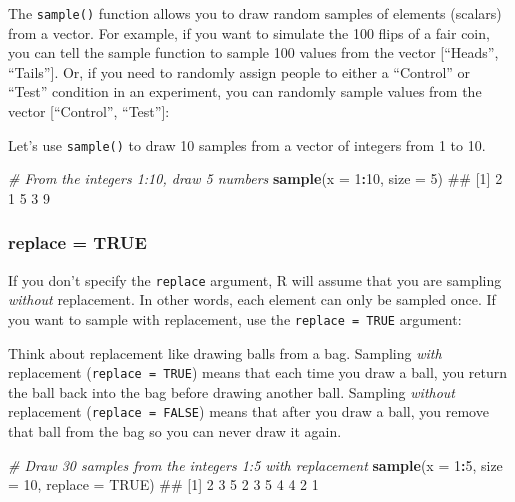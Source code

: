 \documentclass[]{book}
\newenvironment{Shaded}{\begin{snugshade}}{\end{snugshade}}
\newcommand{\KeywordTok}[1]{\textcolor[rgb]{0.13,0.29,0.53}{\textbf{#1}}}
\newcommand{\DataTypeTok}[1]{\textcolor[rgb]{0.13,0.29,0.53}{#1}}
\newcommand{\DecValTok}[1]{\textcolor[rgb]{0.00,0.00,0.81}{#1}}
\newcommand{\CommentTok}[1]{\textcolor[rgb]{0.56,0.35,0.01}{\textit{#1}}}
\newcommand{\OtherTok}[1]{\textcolor[rgb]{0.56,0.35,0.01}{#1}}
\newcommand{\OperatorTok}[1]{\textcolor[rgb]{0.81,0.36,0.00}{\textbf{#1}}}
\newcommand{\NormalTok}[1]{#1}
\theoremstyle{definition}
\theoremstyle{definition}
\theoremstyle{remark}
\begin{document}
The \texttt{sample()} function allows you to draw random samples of
elements (scalars) from a vector. For example, if you want to simulate
the 100 flips of a fair coin, you can tell the sample function to sample
100 values from the vector {[}``Heads'', ``Tails''{]}. Or, if you need
to randomly assign people to either a ``Control'' or ``Test'' condition
in an experiment, you can randomly sample values from the vector
{[}``Control'', ``Test''{]}:

Let's use \texttt{sample()} to draw 10 samples from a vector of integers
from 1 to 10.

\begin{Shaded}
\begin{Highlighting}[]
\CommentTok{# From the integers 1:10, draw 5 numbers}
\KeywordTok{sample}\NormalTok{(}\DataTypeTok{x =} \DecValTok{1}\OperatorTok{:}\DecValTok{10}\NormalTok{, }\DataTypeTok{size  =} \DecValTok{5}\NormalTok{)}
\NormalTok{## [1] 2 1 5 3 9}
\end{Highlighting}
\end{Shaded}

\subsubsection{replace = TRUE}\label{replace-true}

If you don't specify the \texttt{replace} argument, R will assume that
you are sampling \emph{without} replacement. In other words, each
element can only be sampled once. If you want to sample with
replacement, use the \texttt{replace\ =\ TRUE} argument:

Think about replacement like drawing balls from a bag. Sampling
\emph{with} replacement (\texttt{replace\ =\ TRUE}) means that each time
you draw a ball, you return the ball back into the bag before drawing
another ball. Sampling \emph{without} replacement
(\texttt{replace\ =\ FALSE}) means that after you draw a ball, you
remove that ball from the bag so you can never draw it again.

\begin{Shaded}
\begin{Highlighting}[]
\CommentTok{# Draw 30 samples from the integers 1:5 with replacement}
\KeywordTok{sample}\NormalTok{(}\DataTypeTok{x =} \DecValTok{1}\OperatorTok{:}\DecValTok{5}\NormalTok{, }\DataTypeTok{size =} \DecValTok{10}\NormalTok{, }\DataTypeTok{replace =} \OtherTok{TRUE}\NormalTok{)}
\NormalTok{##  [1] 2 3 5 2 3 5 4 4 2 1}
\end{Highlighting}
\end{Shaded}
\end{document}
